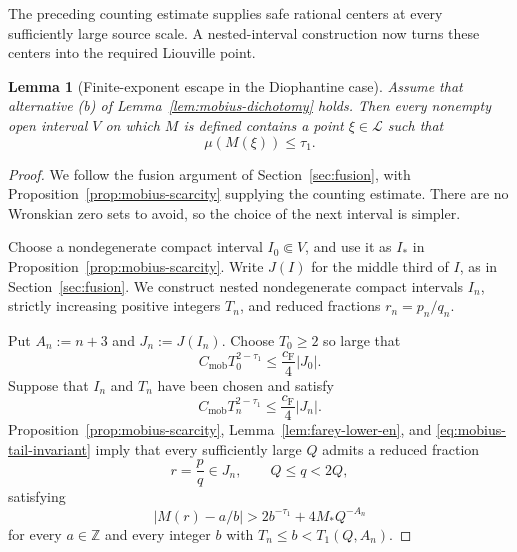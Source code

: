 \documentclass[11pt]{amsart}
\numberwithin{equation}{section}
\newtheorem{lemma}[lemma]{Lemma}
\theoremstyle{definition}
\theoremstyle{remark}
\newcommand{\Z}{\mathbb Z}
\newcommand{\Lio}{\mathscr L}
\newcommand{\abs}[1]{\left\lvert #1\right\rvert}
\begin{document}
The preceding counting estimate supplies safe rational centers at every
sufficiently large source scale. A nested-interval construction now
turns these centers into the required Liouville point.

\begin{lemma}[Finite-exponent escape in the Diophantine case]
\label{lem:mobius-finite-escape}
Assume that alternative \textup{(b)} of
Lemma~\ref{lem:mobius-dichotomy} holds. Then every nonempty open
interval \(V\) on which \(M\) is defined contains a point
\(\xi\in\Lio\) such that
\[
\mu(M(\xi))\leq\tau_1.
\]
\end{lemma}

\begin{proof}
We follow the fusion argument of Section~\ref{sec:fusion}, with
Proposition~\ref{prop:mobius-scarcity} supplying the counting estimate.
There are no Wronskian zero sets to avoid, so the choice of the next
interval is simpler.

Choose a nondegenerate compact interval \(I_0\Subset V\), and use it as
\(I_*\) in Proposition~\ref{prop:mobius-scarcity}. Write \(J(I)\) for
the middle third of \(I\), as in Section~\ref{sec:fusion}.
We construct nested nondegenerate compact intervals \(I_n\), strictly
increasing positive integers \(T_n\), and reduced fractions
\(r_n=p_n/q_n\).

Put \(A_n:=n+3\) and \(J_n:=J(I_n)\). Choose \(T_0\geq2\) so large
that
\begin{equation}\label{eq:mobius-initial-tail}
C_{\mathrm{mob}}T_0^{2-\tau_1}
\leq\frac{c_{\mathrm F}}4|J_0|.
\end{equation}
Suppose that \(I_n\) and \(T_n\) have been chosen and satisfy
\begin{equation}\label{eq:mobius-tail-invariant}
C_{\mathrm{mob}}T_n^{2-\tau_1}
\leq\frac{c_{\mathrm F}}4|J_n|.
\end{equation}
Proposition~\ref{prop:mobius-scarcity},
Lemma~\ref{lem:farey-lower-en}, and
\eqref{eq:mobius-tail-invariant} imply that every sufficiently large
\(Q\) admits a reduced fraction
\[
r=\frac pq\in J_n,
\qquad Q\leq q<2Q,
\]
satisfying
\begin{equation}\label{eq:mobius-safe-center}
\abs{M(r)-a/b}
>
2b^{-\tau_1}+4M_*Q^{-A_n}
\end{equation}
for every \(a\in\Z\) and every integer \(b\) with
\(T_n\leq b<T_1(Q,A_n)\).


\end{proof}
\end{document}
